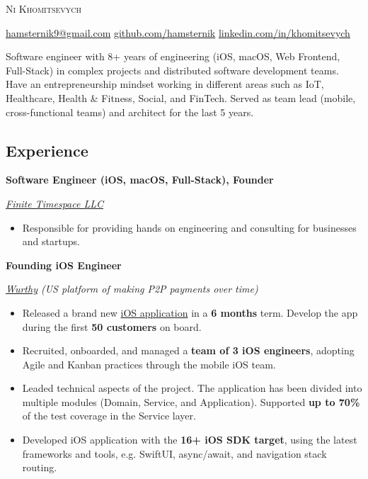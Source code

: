 \documentclass[12pt]{article}
\newcommand{\SectionSpacing}{ %
    \vspace*{1em}
}
\newcommand{\SubSectionSpacing}{
    \vspace*{0.5em}
}
\newcommand{\name}[1]{%
    \Huge %
    \begin{center} \textbf{#1} \end{center}\par
    \normalsize\normalfont%
}
\newcommand{\Experience}[3]{%
    \noindent \textbf{#1}
    \hfill \text{#2} \par
    \noindent \textit{#3} \par
    \normalsize \normalfont \par
}
\begin{document}
\textsc{\huge{Ni Khomitsevych}}

\SectionSpacing

\noindent
\href{mailto:hamsternik9@gmail.com}{hamsternik9@gmail.com} \text{\textbar}
\href{https://github.com/hamsternik}{github.com/hamsternik} \text{\textbar}
\href{https://www.linkedin.com/in/khomitsevych/}{linkedin.com/in/khomitsevych}

\SectionSpacing

\noindent
Software engineer with 8+ years of engineering (iOS, macOS, Web Frontend, Full-Stack) in complex projects and distributed software development teams. 
Have an entrepreneurship mindset working in different areas such as IoT, Healthcare, Health \& Fitness, Social, and FinTech.
Served as team lead (mobile, cross-functional teams) and architect for the last 5 years.


\subsection*{Experience}

\Experience
{Software Engineer (iOS, macOS, Full-Stack), Founder}
{Dec 2023 -- Present}
{\href{finitetimespace.com}{Finite Timespace LLC}}

\noindent
\begin{itemize}[label=-]
    \setlength\itemsep{0cm}
    \item Responsible for providing hands on engineering and consulting for businesses and startups.
\end{itemize}

\SubSectionSpacing

\Experience
{Founding iOS Engineer}
{Jan 2023 -- Nov 2023}
{\href{https://www.wurthy.co}{Wurthy} (US platform of making P2P payments over time)}

\noindent
\begin{itemize}[label=-]
    \setlength\itemsep{0em}
    \item Released a brand new {\href{https://apps.apple.com/us/app/wurthy/id6446956833}{iOS application}} in a \textbf{6 months} term. Develop the app during the first \textbf{50 customers} on board.
    \item Recruited, onboarded, and managed a \textbf{team of 3 iOS engineers}, adopting Agile and Kanban practices through the mobile iOS team.
    \item Leaded technical aspects of the project. The application has been divided into multiple modules (Domain, Service, and Application). Supported \textbf{up to 70\%} of the test coverage in the Service layer.
    \item Developed iOS application with the \textbf{16+ iOS SDK target}, using the latest frameworks and tools, e.g. SwiftUI, async/await, and navigation stack routing.
\end{itemize}
\end{document}
